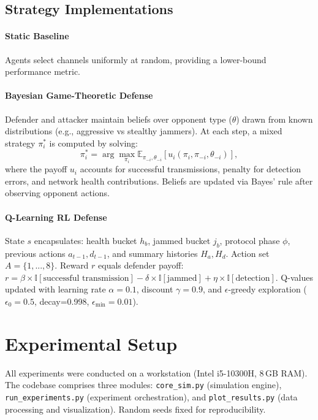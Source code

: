 \documentclass[conference]{IEEEtran}
\begin{document}
\subsection{Strategy Implementations}
\paragraph{Static Baseline} Agents select channels uniformly at random, providing a lower-bound performance metric.

\paragraph{Bayesian Game-Theoretic Defense} Defender and attacker maintain beliefs over opponent type ($\theta$) drawn from known distributions (e.g., aggressive vs stealthy jammers). At each step, a mixed strategy $\pi_i^*$ is computed by solving:
\[
\pi_i^* = \arg\max_{\pi_i} \mathbb{E}_{\pi_{-i},\theta_{-i}}[u_i(\pi_i,\pi_{-i},\theta_{-i})],
\]
where the payoff $u_i$ accounts for successful transmissions, penalty for detection errors, and network health contributions. Beliefs are updated via Bayes' rule after observing opponent actions.

\paragraph{Q-Learning RL Defense} State $s$ encapsulates: health bucket $h_b$, jammed bucket $j_b$, protocol phase $\phi$, previous actions $a_{t-1},d_{t-1}$, and summary histories $H_a, H_d$. Action set $A=\{1,...,8\}$. Reward $r$ equals defender payoff: $r = \beta \times \mathbb{I}[\text{successful transmission}] - \delta \times \mathbb{I}[\text{jammed}] + \eta \times \mathbb{I}[\text{detection}]$. Q-values updated with learning rate $\alpha=0.1$, discount $\gamma=0.9$, and $\epsilon$-greedy exploration ($\epsilon_{0}=0.5$, decay=0.998, $\epsilon_{\min}=0.01$).

\section{Experimental Setup}
All experiments were conducted on a workstation (Intel i5-10300H, 8\,GB RAM). The codebase comprises three modules: \texttt{core\_sim.py} (simulation engine), \texttt{run\_experiments.py} (experiment orchestration), and \texttt{plot\_results.py} (data processing and visualization). Random seeds fixed for reproducibility.
\end{document}
